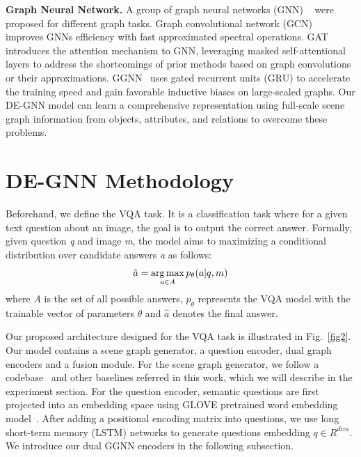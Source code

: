 \documentclass[letterpaper]{article} %
\begin{document}
\vspace{0.05in}
\noindent\textbf{Graph Neural Network.}
A group of graph neural networks (GNN) ~\cite{DBLP:journals/tnn/ScarselliGTHM09,DBLP:conf/cncl/WangGCL16,DBLP:conf/aaai/WangCGL18,DBLP:conf/aistats/SunL19,DBLP:conf/aaai/0001RFHLRG19,DBLP:conf/aaai/LiuCLZLSQ19} were proposed for different graph tasks.
Graph convolutional network (GCN)~\cite{DBLP:conf/iclr/KipfW17} improves GNNs efficiency with fast approximated spectral operations. 
GAT~\cite{DBLP:conf/iclr/VelickovicCCRLB18} introduces the attention mechanism to GNN, leveraging masked self-attentional layers to address the shortcomings of prior methods based on graph convolutions or their approximations. GGNN~\cite{DBLP:journals/corr/LiTBZ15} uses gated recurrent units (GRU) to accelerate the training speed and gain favorable inductive biases on large-scaled graphs.
Our DE-GNN model can learn a comprehensive representation using full-scale scene graph information from objects, attributes, and relations to overcome these problems.


\section{DE-GNN Methodology}

Beforehand, we define the VQA task. 
It is a classification task where for a given text question about an image, the goal is to output the correct answer. 
Formally, given question \emph{q} and image \emph{m}, the model aims to maximizing a conditional distribution over candidate answers \emph{a} as follows:
\begin{equation}\notag
    \hat{a} = \mathop{\arg\max}_{a \in A}p_\theta(a|q, m)
\end{equation}
where \emph{A} is the set of all possible answers, $p_\theta$ represents the VQA model with the trainable vector of parameters $\theta$ and $\hat{a}$ denotes the final answer.

Our proposed architecture designed for the VQA task is illustrated in Fig.~\ref{fig2}. 
Our model contains a scene graph generator, a question encoder, dual graph encoders and a fusion module. For the scene graph generator, we follow a codebase~\cite{tang2020sggcode} and other baselines referred in this work, which we will describe in the experiment section. 
For the question encoder, semantic questions are first projected into an embedding space using GLOVE pretrained word embedding model~\cite{pennington-etal-2014-glove}. 
After adding a positional encoding matrix into questions, we use long short-term memory (LSTM) networks to generate questions embedding $q \in R^{dim}$. 
We introduce our dual GGNN encoders in the following subsection.
\end{document}
